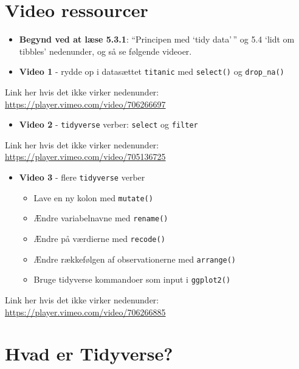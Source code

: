 \documentclass[
]{book}
\providecommand{\tightlist}{%
  \setlength{\itemsep}{0pt}\setlength{\parskip}{0pt}}
\begin{document}
\hypertarget{video-ressourcer-2}{%
\section{Video ressourcer}\label{video-ressourcer-2}}

\begin{itemize}
\item
  \textbf{Begynd ved at læse 5.3.1}: ``Principen med `tidy data'\,'' og 5.4 `lidt om tibbles' nedenunder, og så se følgende videoer.
\item
  \textbf{Video 1} - rydde op i datasættet \texttt{titanic} med \texttt{select()} og \texttt{drop\_na()}
\end{itemize}

Link her hvis det ikke virker nedenunder: \url{https://player.vimeo.com/video/706266697}

\begin{itemize}
\tightlist
\item
  \textbf{Video 2} - \texttt{tidyverse} verber: \texttt{select} og \texttt{filter}
\end{itemize}

Link her hvis det ikke virker nedenunder: \url{https://player.vimeo.com/video/705136725}

\begin{itemize}
\tightlist
\item
  \textbf{Video 3} - flere \texttt{tidyverse} verber

  \begin{itemize}
  \tightlist
  \item
    Lave en ny kolon med \texttt{mutate()}
  \item
    Ændre variabelnavne med \texttt{rename()}
  \item
    Ændre på værdierne med \texttt{recode()}
  \item
    Ændre rækkefølgen af observationerne med \texttt{arrange()}
  \item
    Bruge tidyverse kommandoer som input i \texttt{ggplot2()}
  \end{itemize}
\end{itemize}

Link her hvis det ikke virker nedenunder: \url{https://player.vimeo.com/video/706266885}

\hypertarget{hvad-er-tidyverse}{%
\section{Hvad er Tidyverse?}\label{hvad-er-tidyverse}}
\end{document}
